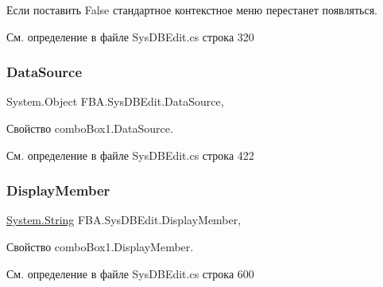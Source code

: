 Если поставить False стандартное контекстное меню перестанет появляться. 



См. определение в файле Sys\+D\+B\+Edit.\+cs строка 320

\mbox{\label{class_f_b_a_1_1_sys_d_b_edit_a84a3fd381f6d1e1c573de118ae14c021}} 
\subsubsection{\texorpdfstring{Data\+Source}{DataSource}}
{\footnotesize\ttfamily System.\+Object F\+B\+A.\+Sys\+D\+B\+Edit.\+Data\+Source\hspace{0.3cm}{\ttfamily [get]}, {\ttfamily [set]}}



Свойство combo\+Box1.\+Data\+Source. 



См. определение в файле Sys\+D\+B\+Edit.\+cs строка 422

\mbox{\label{class_f_b_a_1_1_sys_d_b_edit_ada000c9a7c98c6ecbba7b3e956dd8bfb}} 
\subsubsection{\texorpdfstring{Display\+Member}{DisplayMember}}
{\footnotesize\ttfamily \mbox{\hyperlink{namespace_f_b_a_a940b390561ecfbdb6e1606ec1711bd59a27118326006d3829667a400ad23d5d98}{System.\+String}} F\+B\+A.\+Sys\+D\+B\+Edit.\+Display\+Member\hspace{0.3cm}{\ttfamily [get]}, {\ttfamily [set]}}



Свойство combo\+Box1.\+Display\+Member. 



См. определение в файле Sys\+D\+B\+Edit.\+cs строка 600

\mbox{\label{class_f_b_a_1_1_sys_d_b_edit_adc0915832fe0d8c4d563a46585e085fa}} 
